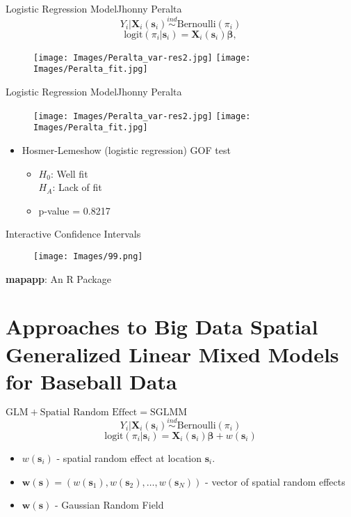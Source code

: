 \documentclass{beamer}
\begin{document}
\begin{frame}{Logistic Regression Model}{Jhonny Peralta} %
$$Y_{i}|\mathbf{X}_{i}(\mathbf{s}_{i}) \stackrel{ind}{\sim} \mbox{Bernoulli}(\pi_{i}) $$
$$ \text{logit}(\pi_{i}|\pmb{s}_{i}) = \mathbf{X}_{i}(\mathbf{s}_{i})\pmb{\beta}, $$
  \begin{figure}[H]
	\centering
	\texttt{[image: Images/Peralta\_var-res2.jpg]}
	\texttt{[image: Images/Peralta\_fit.jpg]}
	\end{figure}
\end{frame}

\begin{frame}{Logistic Regression Model}{Jhonny Peralta} %
  \begin{figure}[H]
	\centering
	\texttt{[image: Images/Peralta\_var-res2.jpg]}
	\texttt{[image: Images/Peralta\_fit.jpg]}
	\end{figure}
\begin{itemize}
\addtolength{\itemsep}{0.5\baselineskip}
\item Hosmer-Lemeshow (logistic regression) GOF test
  \begin{itemize}
  \addtolength{\itemsep}{0.5\baselineskip}
  \item $H_0$: Well fit \\ $H_A$: Lack of fit
  \item p-value = 0.8217
  \end{itemize}
\end{itemize}
\end{frame}

\begin{frame}{Interactive Confidence Intervals}{} %
  \begin{figure}[H]
	\centering
	\texttt{[image: Images/99.png]}
	\end{figure}
{\bf mapapp}: An R Package
\end{frame}

\section{Approaches to Big Data Spatial Generalized Linear Mixed Models for Baseball Data}

\begin{frame}{$\text{GLM} + \text{Spatial Random Effect} = \text{SGLMM}$}{}
$$ Y_{i}|\mathbf{X}_{i}(\mathbf{s}_{i}) \stackrel{ind}{\sim} \mbox{Bernoulli}(\pi_{i}) $$
$$\text{logit}(\pi_{i}|\pmb{s}_{i}) = \mathbf{X}_{i}(\mathbf{s}_{i})\pmb{\beta} + w(\pmb{s}_{i}) $$
\begin{itemize}
\addtolength{\itemsep}{0.5\baselineskip}
\item $w(\pmb{s}_{i})$ - spatial random effect at location $\pmb{s}_{i}$.
\item $\pmb{w}(\pmb{s}) = (w(\pmb{s}_{1}), w(\pmb{s}_{2}), \dots, w(\pmb{s}_{N}))$  - vector of spatial random effects
\item $\pmb{w}(\pmb{s})$ - Gaussian Random Field
\end{itemize}
\end{frame}
\end{document}
